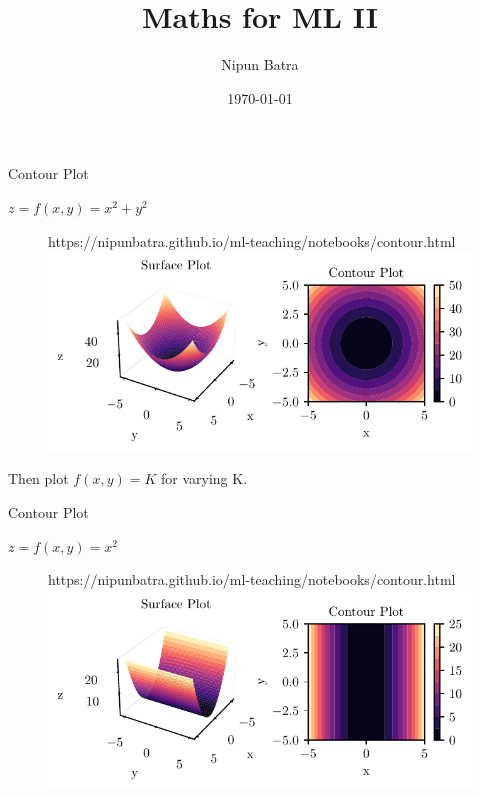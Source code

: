 \documentclass{beamer}
\title{Maths for ML II}
\date{\today}
\author{Nipun Batra}
\institute{IIT Gandhinagar}
\begin{document}
  \maketitle



\begin{frame}{Contour Plot}

	$z = f(x,y) = x^{2} + y^{2}$\\

	\begin{figure}[htp]
		\centering
		\begin{notebookbox}{https://nipunbatra.github.io/ml-teaching/notebooks/contour.html}
		  \includegraphics[width=\linewidth]{../assets/mathematical-ml/figures/contour-x_squared_plus_y_squared.pdf}
		\end{notebookbox}
	  \end{figure}

Then plot $f(x,y)=K$ for varying K.

\end{frame}


\begin{frame}{Contour Plot}

$z = f(x,y) = x^{2}$\\

\begin{figure}[htp]
	\centering
	\begin{notebookbox}{https://nipunbatra.github.io/ml-teaching/notebooks/contour.html}
	  \includegraphics[width=\linewidth]{../assets/mathematical-ml/figures/contour-x_squared.pdf}
	\end{notebookbox}
  \end{figure}

\end{frame}
\end{document}
